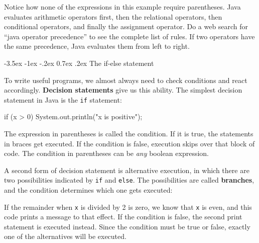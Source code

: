 \documentclass[12pt]{book}
\makeatletter
\theoremstyle{exercise}
\newcommand{\java}[1]{\verb"#1"}
\renewcommand{\section}{\@startsection{section}{1}{\z@}%
    {-3.5ex \@plus -1ex \@minus -.2ex}%
    {0.7ex \@plus.2ex}%
    {\normalfont\Large\bfseries}}
\newcommand{\java}[1]{\lstinline{#1}} %
\makeatother
\begin{document}
Notice how none of the expressions in this example require parentheses.
Java evaluates arithmetic operators first, then the relational operators, then conditional operators, and finally the assignment operator.
Do a web search for ``java operator precedence'' to see the complete list of rules.
If two operators have the same precedence, Java evaluates them from left to right.


\section{The if-else statement}


To write useful programs, we almost always need to check conditions and react accordingly.
{\bf Decision statements} give us this ability.
The simplest decision statement in Java is the \java{if} statement:

\begin{code}
    if (x > 0) {
        System.out.println("x is positive");
    }
\end{code}

The expression in parentheses is called the condition.
If it is true, the statements in braces get executed.
If the condition is false, execution skips over that block of code.
The condition in parentheses can be {\it any} boolean expression.


A second form of decision statement is alternative execution, in which there are two possibilities indicated by \java{if} and \java{else}.
The possibilities are called {\bf branches}, and the condition determines which one gets executed:


If the remainder when \java{x} is divided by 2 is zero, we know that \java{x} is even, and this code prints a message to that effect.
If the condition is false, the second print statement is executed instead.
Since the condition must be true or false, exactly one of the alternatives will be executed.
\end{document}
